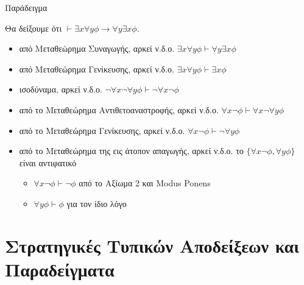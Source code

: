 \documentclass{beamer}
\begin{document}
\begin{frame}{Παράδειγμα}
  \begin{block}{}
    Θα δείξουμε ότι $\vdash \exists x \forall y \phi \rightarrow \forall y \exists x \phi$.
    \begin{itemize}
      \item[] από Μεταθεώρημα Συναγωγής, αρκεί ν.δ.ο. $\exists x \forall y \phi \vdash \forall y \exists x \phi$
      \item[] από Μεταθεώρημα Γενίκευσης, αρκεί ν.δ.ο. $\exists x \forall y \phi \vdash \exists x \phi$
      \item[] ισοδύναμα, αρκεί ν.δ.ο. $\neg\forall x \neg\forall y \phi \vdash \neg\forall x \neg\phi$
      \item[] από το Μεταθεώρημα Αντιθετοαναστροφής, αρκεί ν.δ.ο. $\forall x \neg\phi \vdash \forall x \neg\forall y \phi$
      \item[] από το Μεταθεώρημα Γενίκευσης, αρκεί ν.δ.ο. $\forall x \neg\phi \vdash \neg\forall y \phi$
      \item[] από το Μεταθεώρημα της εις άτοπον απαγωγής, αρκεί ν.δ.ο. το $\{\forall x \neg\phi, \forall y \phi\}$ είναι αντιφατικό
      \begin{itemize}
        \item $\forall x \neg\phi \vdash \neg\phi$ από το Αξίωμα 2 και Modus Ponens
        \item $\forall y \phi \vdash \phi$ για τον ίδιο λόγο
      \end{itemize}
    \end{itemize}
  \end{block}
\end{frame}

\section{Στρατηγικές Τυπικών Αποδείξεων και Παραδείγματα}
\end{document}

